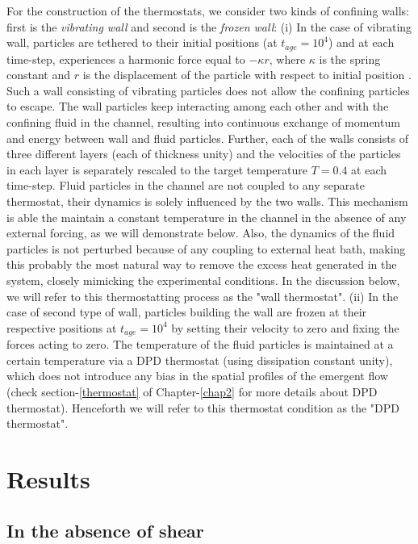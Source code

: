 For the construction of the thermostats, we consider two kinds of confining walls: first is the \textit{vibrating wall}  and second is the \textit{frozen wall}: (i) In the case of vibrating wall, particles are tethered to their initial positions (at $t_{age} = 10^4$) and at each time-step, experiences a harmonic force equal to $-\kappa r$, where $\kappa$ is the spring constant and $r$ is the displacement of the particle with respect to initial position \cite{thompson1990,powles1992,todd1995,evansMorrissBook,koplik2001,varnik2002,koplik2006}. Such a wall consisting of vibrating particles does not allow the confining particles to escape. The wall particles keep interacting among each other and  with the confining fluid in the channel, resulting into continuous exchange of momentum and energy between wall and fluid particles. Further, each of the walls consists of three different layers (each of thickness unity) and the velocities of the particles in each layer is separately rescaled to the target temperature $T = 0.4$ at each time-step\cite{kim2008}. Fluid particles in the channel are not coupled to any separate thermostat, their dynamics is solely influenced by the two walls. This mechanism is able the maintain a constant temperature in the channel in the absence of any external forcing, as we will demonstrate below. Also, the dynamics of the fluid particles is not perturbed because of any coupling to external heat bath, making this probably the most natural way to remove the excess heat generated in the system, closely mimicking the experimental conditions. In the discussion below, we will refer to this thermostatting process as the "wall thermostat".
(ii) In the case of second type of wall, particles building the wall are frozen at their respective positions at $t_{age} = 10^4$  by setting their velocity to zero and fixing the forces acting to zero\cite{pinaki2014}. The temperature of the  fluid particles is maintained at a certain temperature via a DPD thermostat (using dissipation constant unity)\cite{dpd}, which does not introduce any bias in the spatial profiles of the emergent flow (check section-\ref{thermostat} of Chapter-\ref{chap2} for more details about DPD thermostat). Henceforth we will refer to this thermostat condition as the "DPD thermostat".


\section{Results}

\subsection{In the absence of shear}

